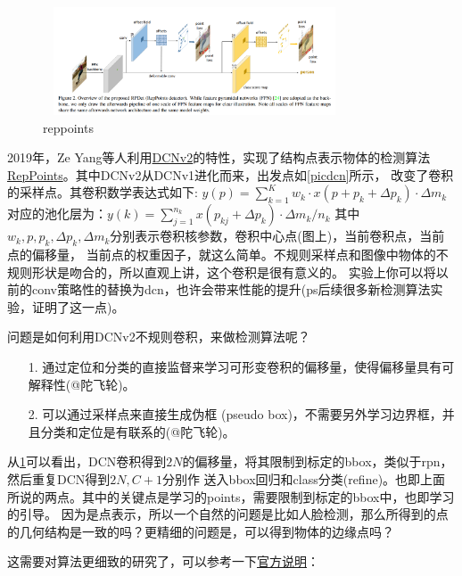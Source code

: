\documentclass[UTF8]{ctexart}
\begin{document}
\begin{figure}[htbp]
	\centering
	\begin{minipage}[t]{0.9\textwidth}
	\centering
	\includegraphics[width=9cm, height=3.2cm]{./pic/RepPoints.png}
	\caption{reppoints}
	\label{picreppoints}
	\end{minipage}
\end{figure}


2019年，Ze Yang等人利用\href{https://arxiv.org/pdf/1811.11168.pdf}{DCNv2}的特性，实现了结构点表示物体的检测算法
\href{https://arxiv.org/pdf/1904.11490.pdf}{RepPoints}。其中DCNv2从DCNv1进化而来，出发点如\ref{picdcn}所示，
改变了卷积的采样点。其卷积数学表达式如下:
$y(p)=\sum_{k=1}^{K} w_{k} \cdot x\left(p+p_{k}+\Delta p_{k}\right) \cdot \Delta m_{k}$
对应的池化层为：$y(k)=\sum_{j=1}^{n_{k}} x\left(p_{k j}+\Delta p_{k}\right) \cdot \Delta m_{k} / n_{k}$
其中$w_k, p, p_k, \Delta p_k, \Delta m_k$分别表示卷积核参数，卷积中心点(图上)，当前卷积点，当前点的偏移量，
当前点的权重因子，就这么简单。不规则采样点和图像中物体的不规则形状是吻合的，所以直观上讲，这个卷积是很有意义的。
实验上你可以将以前的conv策略性的替换为dcn，也许会带来性能的提升(ps后续很多新检测算法实验，证明了这一点)。

问题是如何利用DCNv2不规则卷积，来做检测算法呢？

\begin{itemize}
	\item[1.] 通过定位和分类的直接监督来学习可形变卷积的偏移量，使得偏移量具有可解释性(@陀飞轮)。
	\item[2.] 可以通过采样点来直接生成伪框 (pseudo box)，不需要另外学习边界框，并且分类和定位是有联系的(@陀飞轮)。
\end{itemize}

从\ref{picreppoints}可以看出，DCN卷积得到$2N$的偏移量，将其限制到标定的bbox，类似于rpn，然后重复DCN得到$2N, C+1$分别作
送入bbox回归和class分类(refine)。也即上面所说的两点。其中的关键点是学习的points，需要限制到标定的bbox中，也即学习的引导。
因为是点表示，所以一个自然的问题是比如人脸检测，那么所得到的点的几何结构是一致的吗？更精细的问题是，可以得到物体的边缘点吗？

这需要对算法更细致的研究了，可以参考一下\href{https://www.zhihu.com/question/322372759/answer/798327725}{官方说明}：
\end{document}
